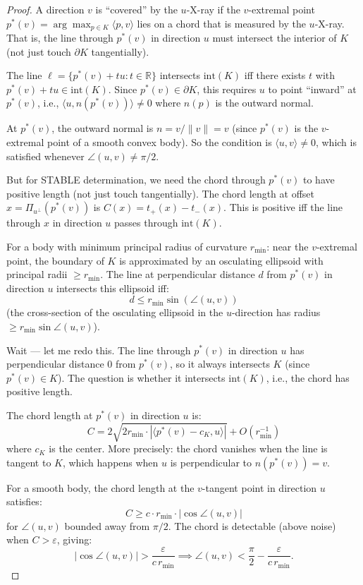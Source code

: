 \begin{proof}
A direction $v$ is ``covered'' by the $u$-X-ray if the $v$-extremal point $p^*(v) = \arg\max_{p \in K} \langle p, v \rangle$ lies on a chord that is measured by the $u$-X-ray. That is, the line through $p^*(v)$ in direction $u$ must intersect the interior of $K$ (not just touch $\partial K$ tangentially).

The line $\ell = \{p^*(v) + tu : t \in \mathbb{R}\}$ intersects $\mathrm{int}(K)$ iff there exists $t$ with $p^*(v) + tu \in \mathrm{int}(K)$. Since $p^*(v) \in \partial K$, this requires $u$ to point ``inward'' at $p^*(v)$, i.e., $\langle u, n(p^*(v)) \rangle \neq 0$ where $n(p)$ is the outward normal.

At $p^*(v)$, the outward normal is $n = v/\|v\| = v$ (since $p^*(v)$ is the $v$-extremal point of a smooth convex body). So the condition is $\langle u, v \rangle \neq 0$, which is satisfied whenever $\angle(u, v) \neq \pi/2$.

But for STABLE determination, we need the chord through $p^*(v)$ to have positive length (not just touch tangentially). The chord length at offset $x = \Pi_{u^\perp}(p^*(v))$ is $C(x) = t_+(x) - t_-(x)$. This is positive iff the line through $x$ in direction $u$ passes through $\mathrm{int}(K)$.

For a body with minimum principal radius of curvature $r_{\min}$: near the $v$-extremal point, the boundary of $K$ is approximated by an osculating ellipsoid with principal radii $\geq r_{\min}$. The line at perpendicular distance $d$ from $p^*(v)$ in direction $u$ intersects this ellipsoid iff:
\[
  d \leq r_{\min} \sin(\angle(u, v))
\]
(the cross-section of the osculating ellipsoid in the $u$-direction has radius $\geq r_{\min} \sin\angle(u,v)$).

Wait --- let me redo this. The line through $p^*(v)$ in direction $u$ has perpendicular distance 0 from $p^*(v)$, so it always intersects $K$ (since $p^*(v) \in K$). The question is whether it intersects $\mathrm{int}(K)$, i.e., the chord has positive length.

The chord length at $p^*(v)$ in direction $u$ is:
\[
  C = 2 \sqrt{2 r_{\min} \cdot |\langle p^*(v) - c_K, u \rangle|} + O(r_{\min}^{-1})
\]
where $c_K$ is the center. More precisely: the chord vanishes when the line is tangent to $K$, which happens when $u$ is perpendicular to $n(p^*(v)) = v$.

For a smooth body, the chord length at the $v$-tangent point in direction $u$ satisfies:
\[
  C \geq c \cdot r_{\min} \cdot |\cos\angle(u, v)|
\]
for $\angle(u,v)$ bounded away from $\pi/2$. The chord is detectable (above noise) when $C > \varepsilon$, giving:
\[
  |\cos\angle(u,v)| > \frac{\varepsilon}{c \, r_{\min}} \implies \angle(u, v) < \frac{\pi}{2} - \frac{\varepsilon}{c \, r_{\min}}.
\]


\end{proof}
